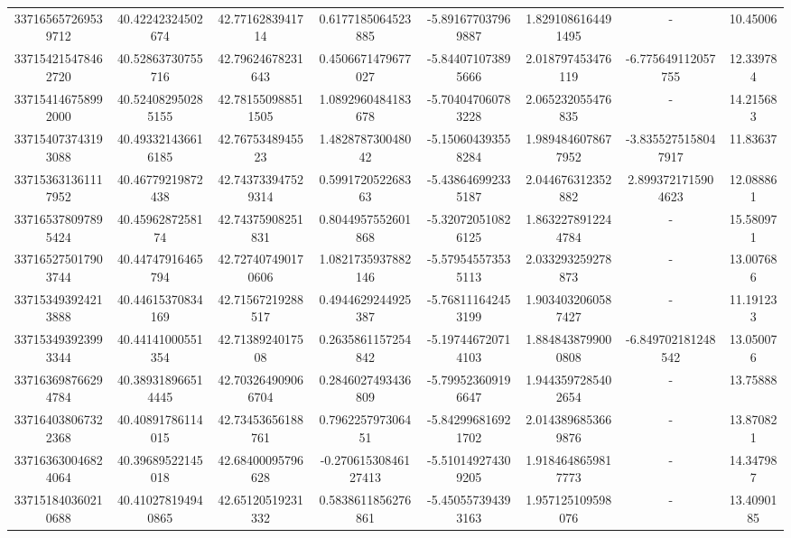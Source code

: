 \documentclass{article}
\begin{document}
\begin{landscape}
\begin{longtable}[c]{S[table-format=18.0]S[table-format=2.15]S[table-format=2.15]S[table-format=-2.17]S[table-format=-2.16]S[table-format=-2.16]S[table-format=-3.16]S[table-format=2.7]}
337165657269539712 & 40.42242324502674  & 42.7716283941714   & 0.6177185064523885    & -5.891677037969887  & 1.8291086164491495 & {-}                  & 10.45006   \\
337154215478462720 & 40.52863730755716  & 42.79624678231643  & 0.4506671479677027    & -5.844071073895666  & 2.018797453476119  & -6.775649112057755  & 12.339784  \\
337154146758992000 & 40.524082950285155 & 42.781550988511505 & 1.0892960484183678    & -5.704047060783228  & 2.065232055476835  & {-}                  & 14.215683  \\
337154073743193088 & 40.493321436616185 & 42.7675348945523   & 1.482878730048042     & -5.150604393558284  & 1.9894846078677952 & -3.8355275158047917 & 11.83637   \\
337153631361117952 & 40.46779219872438  & 42.743733947529314 & 0.599172052268363     & -5.438646992335187  & 2.044676312352882  & 2.8993721715904623  & 12.088861  \\
337165378097895424 & 40.4596287258174   & 42.74375908251831  & 0.8044957552601868    & -5.320720510826125  & 1.8632278912244784 & {-}                  & 15.580971  \\
337165275017903744 & 40.44747916465794  & 42.727407490170606 & 1.0821735937882146    & -5.579545573535113  & 2.033293259278873  & {-}                  & 13.007686  \\
337153493924213888 & 40.44615370834169  & 42.71567219288517  & 0.4944629244925387    & -5.768111642453199  & 1.9034032060587427 & {-}                  & 11.191233  \\
337153493923993344 & 40.44141000551354  & 42.7138924017508   & 0.2635861157254842    & -5.197446720714103  & 1.8848438799000808 & -6.849702181248542  & 13.050076  \\
337163698766294784 & 40.389318966514445 & 42.703264909066704 & 0.2846027493436809    & -5.799523609196647  & 1.9443597285402654 & {-}                  & 13.75888   \\
337164038067322368 & 40.40891786114015  & 42.73453656188761  & 0.796225797306451     & -5.842996816921702  & 2.0143896853669876 & {-}                  & 13.870821  \\
337163630046824064 & 40.39689522145018  & 42.68400095796628  & -0.27061530846127413  & -5.510149274309205  & 1.9184648659817773 & {-}                  & 14.347987  \\
337151840360210688 & 40.410278194940865 & 42.65120519231332  & 0.5838611856276861    & -5.450557394393163  & 1.957125109598076  & {-}                  & 13.4090185 \\

\end{longtable}
\end{landscape}
\end{document}
